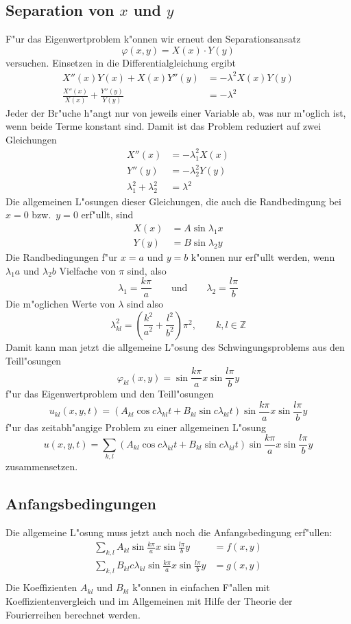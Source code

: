\subsection{Separation von $x$ und $y$}
F"ur das Eigenwertproblem k"onnen wir erneut den Separationsansatz
\[
\varphi(x,y)=X(x)\cdot Y(y)
\]
versuchen.
Einsetzen in die Differentialgleichung ergibt
\begin{align*}
X''(x)Y(x)+X(x)Y''(y)&=-\lambda^2 X(x)Y(y)
\\
\frac{X''(x)}{X(x)}+\frac{Y''(y)}{Y(y)}&=-\lambda^2
\end{align*}
Jeder der Br"uche h"angt nur von jeweils einer Variable ab, was nur
m"oglich ist, wenn beide Terme konstant sind. Damit ist das Problem
reduziert auf zwei Gleichungen
\begin{align*}
X''(x)&=-\lambda_1^2X(x)\\
Y''(y)&=-\lambda_2^2Y(y)\\
\lambda_1^2+\lambda_2^2&=\lambda^2
\end{align*}
Die allgemeinen L"osungen dieser Gleichungen, die auch die Randbedingung
bei $x=0$ bzw.~$y=0$ erf"ullt, sind
\begin{align*}
X(x)&=A\sin \lambda_1x\\
Y(y)&=B\sin \lambda_2y
\end{align*}
Die Randbedingungen f"ur $x=a$ und $y=b$ k"onnen nur erf"ullt werden,
wenn $\lambda_1a$ und $\lambda_2b$ Vielfache von $\pi$ sind, also
\[
\lambda_1=\frac{k\pi}a
\qquad
\text{und}
\qquad
\lambda_2=\frac{l\pi}b
\]
Die m"oglichen Werte von $\lambda$ sind also
\[
\lambda_{kl}^2=\left(\frac{k^2}{a^2} + \frac{l^2}{b^2}\right)\pi^2,\qquad k,l\in\mathbb Z
\]
Damit kann man jetzt die allgemeine L"osung des Schwingungsproblems aus den
Teill"osungen
\[
\varphi_{kl}(x,y)=\sin \frac{k\pi}{a}x\sin\frac{l\pi}{b}y
\]
f"ur das Eigenwertproblem
und den Teill"osungen
\[
u_{kl}(x,y,t)
=
(A_{kl}\cos c\lambda_{kl} t+
B_{kl}\sin c\lambda_{kl} t)
\sin \frac{k\pi}{a}x\sin\frac{l\pi}{b}y
\]
f"ur das zeitabh"angige Problem
zu einer allgemeinen L"osung
\begin{equation}
u(x,y,t)=\sum_{k,l}
(A_{kl}\cos c\lambda_{kl} t+
B_{kl}\sin c\lambda_{kl} t)
\sin \frac{k\pi}{a}x\sin\frac{l\pi}{b}y
\label{allgemeineloesung}
\end{equation}
zusammensetzen.

\subsection{Anfangsbedingungen}
Die allgemeine L"osung muss jetzt auch noch die Anfangsbedingung erf"ullen:
\begin{align*}
\sum_{k,l}A_{kl}
\sin \frac{k\pi}{a}x\sin\frac{l\pi}{b}y&=f(x,y)\\
\sum_{k,l}B_{kl}c\lambda_{kl}
\sin \frac{k\pi}{a}x\sin\frac{l\pi}{b}y&=g(x,y)\\
\end{align*}
Die Koeffizienten $A_{kl}$ und $B_{kl}$ k"onnen in einfachen F"allen mit
Koeffizientenvergleich und im Allgemeinen mit Hilfe der Theorie
der Fourierreihen berechnet werden.


